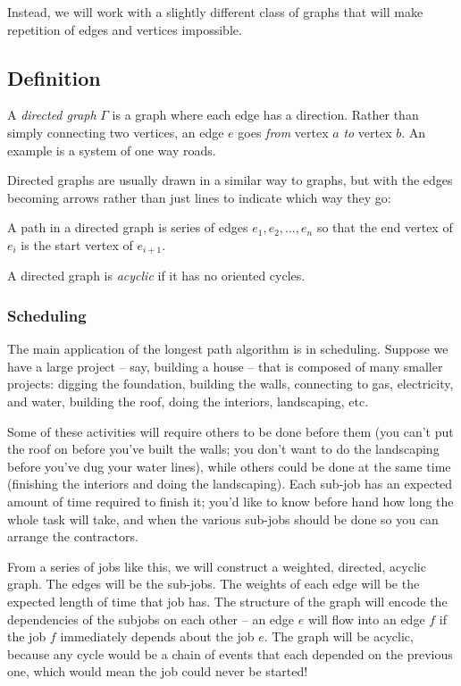 \documentclass[]{article}
\begin{document}
Instead, we will work with a slightly different class of graphs that
will make repetition of edges and vertices impossible.

\subsection{Definition}\label{definition-9}

A \emph{directed graph} \(\Gamma\) is a graph where each edge has a
direction. Rather than simply connecting two vertices, an edge \(e\)
goes \emph{from} vertex \(a\) \emph{to} vertex \(b\). An example is a
system of one way roads.

Directed graphs are usually drawn in a similar way to graphs, but with
the edges becoming arrows rather than just lines to indicate which way
they go:

A path in a directed graph is series of edges \(e_1, e_2, \dots, e_n\)
so that the end vertex of \(e_i\) is the start vertex of \(e_{i+1}\).

A directed graph is \emph{acyclic} if it has no oriented cycles.

\subsubsection{Scheduling}\label{scheduling}

The main application of the longest path algorithm is in scheduling.
Suppose we have a large project -- say, building a house -- that is
composed of many smaller projects: digging the foundation, building the
walls, connecting to gas, electricity, and water, building the roof,
doing the interiors, landscaping, etc.

Some of these activities will require others to be done before them (you
can't put the roof on before you've built the walls; you don't want to
do the landscaping before you've dug your water lines), while others
could be done at the same time (finishing the interiors and doing the
landscaping). Each sub-job has an expected amount of time required to
finish it; you'd like to know before hand how long the whole task will
take, and when the various sub-jobs should be done so you can arrange
the contractors.

From a series of jobs like this, we will construct a weighted, directed,
acyclic graph. The edges will be the sub-jobs. The weights of each edge
will be the expected length of time that job has. The structure of the
graph will encode the dependencies of the subjobs on each other -- an
edge \(e\) will flow into an edge \(f\) if the job \(f\) immediately
depends about the job \(e\). The graph will be acyclic, because any
cycle would be a chain of events that each depended on the previous one,
which would mean the job could never be started!
\end{document}
